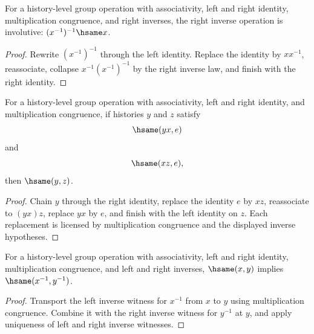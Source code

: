 \begin{theorem}
\label{thm:group-right-inverse-involutive}
For a history-level group operation with associativity, left and right
identity, multiplication congruence, and right inverses, the right inverse
operation is involutive: $(x^{-1})^{-1}\hsame x$.
\end{theorem}
\begin{proof}
Rewrite $(x^{-1})^{-1}$ through the left identity. Replace the identity
by $xx^{-1}$, reassociate, collapse $x^{-1}(x^{-1})^{-1}$ by the right
inverse law, and finish with the right identity.
\end{proof}

\begin{theorem}
\label{thm:group-left-right-inverse-uniqueness}
For a history-level group operation with associativity, left and right identity,
and multiplication congruence, if histories $y$ and $z$ satisfy
$$
\hsame(yx,e)
$$
and
$$
\hsame(xz,e),
$$
then $\hsame(y,z)$.
\end{theorem}
\begin{proof}
Chain $y$ through the right identity, replace the identity $e$ by $xz$,
reassociate to $(yx)z$, replace $yx$ by $e$, and finish with the left identity
on $z$. Each replacement is licensed by multiplication congruence and the
displayed inverse hypotheses.
\end{proof}

\begin{theorem}
\label{thm:group-inverse-congruence-from-laws}
For a history-level group operation with associativity, left and right identity,
multiplication congruence, and left and right inverses, \(\hsame(x,y)\) implies
\(\hsame(x^{-1},y^{-1})\).
\end{theorem}
\begin{proof}
Transport the left inverse witness for \(x^{-1}\) from \(x\) to \(y\) using
multiplication congruence. Combine it with the right inverse witness for
\(y^{-1}\) at \(y\), and apply uniqueness of left and right inverse witnesses.
\end{proof}

